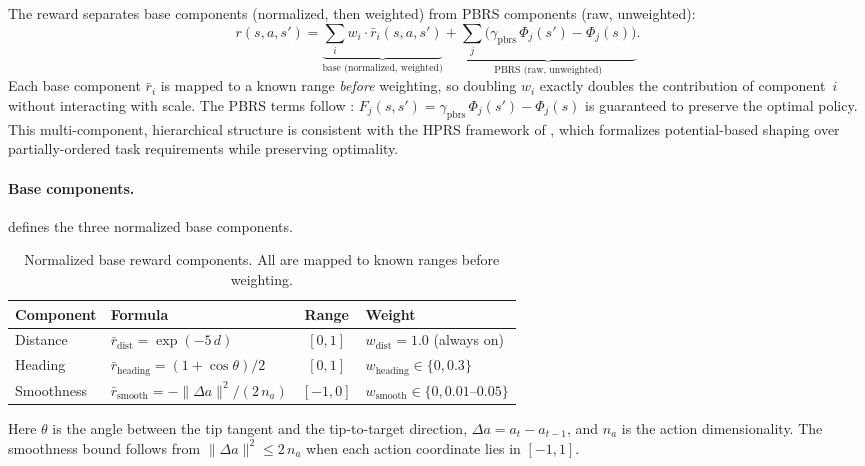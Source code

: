 \documentclass[11pt]{article}
\begin{document}
The reward separates base components (normalized, then weighted) from PBRS components (raw, unweighted):
\begin{equation}
  r(s, a, s') = \underbrace{\sum_{i} w_i \cdot \bar{r}_i(s, a, s')}_{\text{base (normalized, weighted)}}
              + \underbrace{\sum_{j} \bigl(\gamma_{\text{pbrs}}\,\Phi_j(s') - \Phi_j(s)\bigr)}_{\text{PBRS (raw, unweighted)}}.
  \label{eq:reward-normalized}
\end{equation}
Each base component $\bar{r}_i$ is mapped to a known range \emph{before} weighting, so doubling $w_i$ exactly doubles the contribution of component~$i$ without interacting with scale.
The PBRS terms follow \citet{Ng1999}: $F_j(s,s') = \gamma_{\text{pbrs}}\,\Phi_j(s') - \Phi_j(s)$ is guaranteed to preserve the optimal policy.
This multi-component, hierarchical structure is consistent with the HPRS framework of \citet{Berducci2022}, which formalizes potential-based shaping over partially-ordered task requirements while preserving optimality.

\paragraph{Base components.}
 defines the three normalized base components.

\begin{table}[H]
  \centering
  \small
  \renewcommand{\arraystretch}{1.3}
  \caption{Normalized base reward components. All are mapped to known ranges before weighting.}
  \label{tab:reward-base}
  \begin{tabular}{@{}llcl@{}}
    \toprule
    \textbf{Component} & \textbf{Formula} & \textbf{Range} & \textbf{Weight} \\
    \midrule
    Distance    & $\bar{r}_{\text{dist}} = \exp(-5\,d)$                              & $[0, 1]$  & $w_{\text{dist}} = 1.0$ (always on) \\
    Heading     & $\bar{r}_{\text{heading}} = (1 + \cos\theta) / 2$                  & $[0, 1]$  & $w_{\text{heading}} \in \{0, 0.3\}$ \\
    Smoothness  & $\bar{r}_{\text{smooth}} = -\lVert\Delta a\rVert^2 / (2\,n_a)$     & $[-1, 0]$ & $w_{\text{smooth}} \in \{0, 0.01\text{--}0.05\}$ \\
    \bottomrule
  \end{tabular}
\end{table}

\noindent
Here $\theta$ is the angle between the tip tangent and the tip-to-target direction, $\Delta a = a_t - a_{t-1}$, and $n_a$ is the action dimensionality.
The smoothness bound follows from $\lVert\Delta a\rVert^2 \leq 2\,n_a$ when each action coordinate lies in $[-1,1]$.
\end{document}
